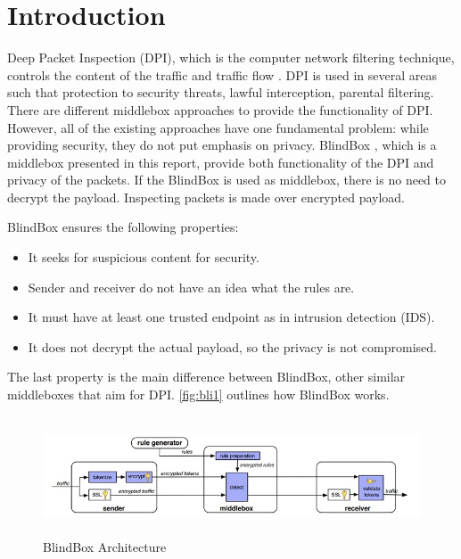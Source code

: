 \documentclass{winslabreport}
\begin{document}
\restoregeometry
\maketitle
\tableofcontents
\listoffigures

\body

\section{Introduction}

Deep Packet Inspection (DPI), which is the computer network filtering technique, controls the content of the traffic and traffic flow \cite{Deep}. DPI is used in several areas such that protection to security threats, lawful interception, parental filtering. There are different middlebox approaches to provide the functionality of DPI. However, all of the existing approaches have one fundamental problem: while providing security, they do not put emphasis on privacy. BlindBox \cite{Blindbox}, which is a middlebox presented in this report, provide both functionality of the DPI and privacy of the packets. If the BlindBox is used as middlebox, there is no need to decrypt the payload. Inspecting packets is made over encrypted payload. 

BlindBox ensures the following properties:

\begin{itemize}
	\item It seeks for suspicious content for security. 
	\item Sender and receiver do not have an idea what the rules are.
	\item It must have at least one trusted endpoint as in intrusion detection (IDS). 
	\item It does not decrypt the actual payload, so the privacy is not compromised.
\end{itemize}

The last property is the main difference between BlindBox, other similar middleboxes that aim for DPI. \autoref{fig:bli1} outlines how BlindBox works.

\begin{figure}[H]
	\centering
	\includegraphics[width=150mm,height=35mm]{blindbox.jpg}
	\caption{BlindBox Architecture}
	\label{fig:bli1}
\end{figure}
\end{document}
